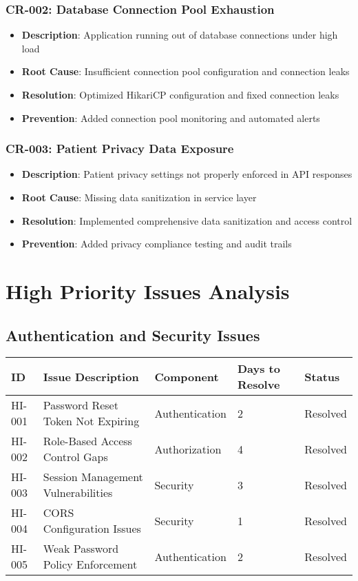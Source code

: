 \documentclass[12pt,a4paper]{article}
\begin{document}
\subsubsection{CR-002: Database Connection Pool Exhaustion}
\begin{itemize}
    \item \textbf{Description}: Application running out of database connections under high load
    \item \textbf{Root Cause}: Insufficient connection pool configuration and connection leaks
    \item \textbf{Resolution}: Optimized HikariCP configuration and fixed connection leaks
    \item \textbf{Prevention}: Added connection pool monitoring and automated alerts
\end{itemize}

\subsubsection{CR-003: Patient Privacy Data Exposure}
\begin{itemize}
    \item \textbf{Description}: Patient privacy settings not properly enforced in API responses
    \item \textbf{Root Cause}: Missing data sanitization in service layer
    \item \textbf{Resolution}: Implemented comprehensive data sanitization and access control
    \item \textbf{Prevention}: Added privacy compliance testing and audit trails
\end{itemize}

\section{High Priority Issues Analysis}

\subsection{Authentication and Security Issues}

\begin{longtable}{|p{1cm}|p{5cm}|p{2cm}|p{2cm}|p{2cm}|}
\hline
\textbf{ID} & \textbf{Issue Description} & \textbf{Component} & \textbf{Days to Resolve} & \textbf{Status} \\
\hline
HI-001 & Password Reset Token Not Expiring & Authentication & 2 & \cellcolor{green!30}Resolved \\
\hline
HI-002 & Role-Based Access Control Gaps & Authorization & 4 & \cellcolor{green!30}Resolved \\
\hline
HI-003 & Session Management Vulnerabilities & Security & 3 & \cellcolor{green!30}Resolved \\
\hline
HI-004 & CORS Configuration Issues & Security & 1 & \cellcolor{green!30}Resolved \\
\hline
HI-005 & Weak Password Policy Enforcement & Authentication & 2 & \cellcolor{green!30}Resolved \\
\hline
\end{longtable}
\end{document}
